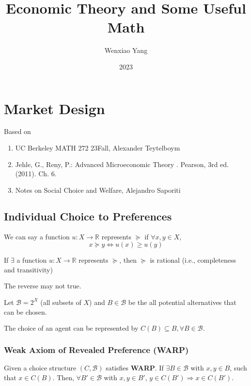 \documentclass[11pt]{elegantbook}
\title{\textbf{Economic Theory and Some Useful Math}}
\author{Wenxiao Yang}
\institute{Haas School of Business, University of California Berkeley}
\date{2023}
\begin{document}
\maketitle
\frontmatter
\tableofcontents
\mainmatter


\chapter{Market Design}
Based on
\begin{enumerate}[$\circ$]
    \item UC Berkeley MATH 272 23Fall, Alexander Teytelboym
    \item  Jehle, G., Reny, P.: Advanced Microeconomic Theory . Pearson, 3rd ed. (2011). Ch. 6.
    \item Notes on Social Choice and Welfare, Alejandro Saporiti
\end{enumerate}
\section{Individual Choice to Preferences}
\begin{definition}
    \normalfont
    We can say a function $u: X \rightarrow \mathbb{R}$ represents $\succeq$ if $\forall x,y\in X$, $$x\succeq y \Leftrightarrow u(x)\geq u(y)$$
\end{definition}

\begin{proposition}
    If $\exists$ a function $u: X \rightarrow \mathbb{R}$ represents $\succeq$, then $\succeq$ is rational (i.e., completeness and transitivity)
\end{proposition}
\begin{note}
    The reverse may not true.
\end{note}

Let $\mathcal{B}=2^X$ (all subsets of $X$) and $B\in \mathcal{B}$ be the all potential alternatives that can be chosen.

The choice of an agent can be represented by $C(B)\subseteq B, \forall B\in \mathcal{B}$.


\subsection{Weak Axiom of Revealed Preference (WARP)}
\begin{definition}
    \normalfont
    Given a choice structure $(C,\mathcal{B})$ satisfies \textbf{WARP}. If $\exists B\in \mathcal{B}$ with $x,y\in B$, such that $x\in C(B)$. Then, $\forall B'\in \mathcal{B}$ with $x,y\in B'$, $y\in C(B') \Rightarrow x\in C(B')$.
\end{definition}
\end{document}
